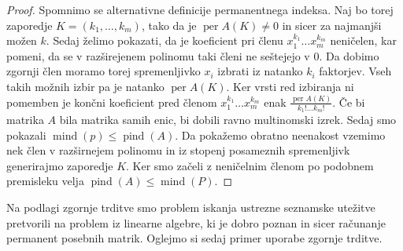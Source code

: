 \documentclass[12pt,a4paper,twoside]{article}
\theoremstyle{definition} %
\theoremstyle{plain} %
\numberwithin{equation}{section}  %
\DeclareMathOperator{\per}{per}
\DeclareMathOperator{\mind}{mind}
\DeclareMathOperator{\pind}{pind}
\begin{document}
\begin{proof}
Spomnimo se alternativne definicije permanentnega indeksa. Naj bo torej zaporedje $K = (k_1, \ldots, k_m)$, tako da je $\per A(K) \neq 0$ in sicer za najmanjši možen $k$. Sedaj želimo pokazati, da je koeficient pri členu $x_1^{k_1}\ldots x_m^{k_m}$ neničelen, kar pomeni, da se v razširejenem polinomu taki členi ne seštejejo v $0$. Da dobimo zgornji člen moramo torej spremenljivko $x_i$ izbrati iz natanko $k_i$ faktorjev. Vseh takih možnih izbir pa je natanko $\per A(K)$. Ker vrsti red izbiranja ni pomemben je končni koeficient pred členom  $x_1^{k_1}\ldots x_m^{k_m}$ enak $\frac{\per A(K)}{k_1!\ldots k_m!}$. Če bi matrika $A$ bila matrika samih enic, bi dobili ravno multinomski izrek. Sedaj smo pokazali $\mind(p) \le \pind(A)$. Da pokažemo obratno neenakost vzemimo nek člen v razširnejem polinomu in iz stopenj posameznih spremenljivk generirajmo zaporedje $K$. Ker smo začeli z neničelnim členom po podobnem premisleku velja $\pind(A) \le \mind(P)$.
\end{proof}
Na podlagi zgornje trditve smo problem iskanja ustrezne seznamske utežitve pretvorili na problem iz linearne algebre, ki je dobro poznan in sicer računanje permanent posebnih matrik. Oglejmo si sedaj primer uporabe zgornje trditve.
\end{document}
